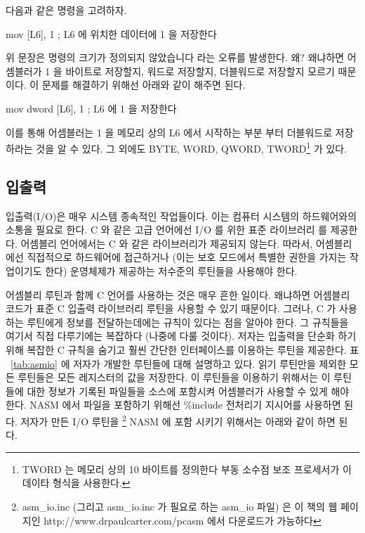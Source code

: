 다음과 같은 명령을 고려하자.
\begin{AsmCodeListing}[frame=none, numbers=none]
      mov    [L6], 1             ; L6 에 위치한 데이터에 1 을 저장한다
\end{AsmCodeListing}

위 문장은 {\code 명령의 크기가 정의되지 않았습니다} 라는 오류를 발생한다. 왜? 왜냐하면 어셈블러가 1 을 바이트로 저장할지, 워드로 저장할지, 
더블워드로 저장할지 모르기 때문이다. 이 문제를 해결하기 위해선 아래와 같이 해주면 된다. 

\begin{AsmCodeListing}[frame=none, numbers=none]
      mov    dword [L6], 1       ; L6 에 1 을 저장한다
\end{AsmCodeListing}
이를 통해 어셈블러는 1 을 메모리 상의 {\code L6} 에서 시작하는 부분 부터 더블워드로 저장하라는 것을 알 수 있다. 그 외에도 {\code BYTE}, 
{\code WORD}, {\code QWORD}, {\code TWORD}\footnote{{\code TWORD} 는 메모리 상의 10 바이트를 정의한다
부동 소수점 보조 프로세서가 이 데이타 형식을 사용한다.} 가 있다.

\subsection{입출력 }

입출력(I/O)은 매우 시스템 종속적인 작업들이다. 이는 컴퓨터 시스템의 하드웨어와의 소통을 필요로 한다. C 와 같은 고급 언어에선 I/O 를 위한 표준 라이브러리
를 제공한다. 어셈블리 언어에서는 C 와 같은 라이브러리가 제공되지 않는다. 따라서, 어셈블리에선 직접적으로 하드웨어에 접근하거나
(이는 보호 모드에서 특별한 권한을 가지는 작업이기도 한다) 운영체제가 제공하는 저수준의 루틴들을 사용해야 한다. 

어셈블리 루틴과 함께 C 언어를 사용하는 것은 매우 흔한 일이다. 왜냐하면 어셈블리 코드가 표준 C 입출력 라이브러리 루틴을 사용할 수 있기 때문이다.
그러나, C 가 사용하는 루틴에게 정보를 전달하는데에는 규칙이 있다는 점을 알아야 한다. 그 규칙들을 여기서 직접 다루기에는 복잡하다 (나중에 다룰 것이다).
저자는 입출력을 단순화 하기 위해 복잡한 C 규칙을 숨기고 훨씬 간단한 인터페이스를 이용하는 루틴을 제공한다. 표 ~\ref{tab:asmio} 에 
저자가 개발한 루틴들에 대해 설명하고 있다. 읽기 루틴만을 제외한 모든 루틴들은 모든 레지스터의 값을 저장한다. 이 루틴들을 이용하기 위해서는 이
루틴들에 대한 정보가 기록된 파일들을 소스에 포함시켜 어셈블러가 사용할 수 있게 해야 한다. NASM 에서 파일을 포함하기 위해선 {\code \%include} 전처리기
지시어를 사용하면 된다. 저자가 만든 I/O 루틴을 \footnote{ {\code asm\_io.inc} (그리고  {\code asm\_io.inc}  가 필요로 하는 {\code asm\_io} 파일) 은 이
책의 웹 페이지인 {\code http://www.drpaulcarter.com/pcasm} 에서 다운로드가 가능하다} NASM 에 포함 시키기 위해서는 아래와 같이 하면 된다.

